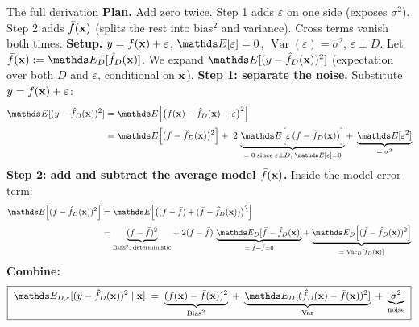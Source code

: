 \documentclass[aspectratio=169]{beamer}
\newcommand{\Var}{\operatorname{Var}}
\newcommand{\Bias}{\operatorname{Bias}}
\newcommand{\fbar}{\bar{f}}
\newcommand{\fDx}{\hat{f}_D(\xv)}
\begin{document}
\begin{frame}{The full derivation}
  \footnotesize
  \textbf{Plan.} Add zero twice. Step 1 adds $\varepsilon$ on one side (exposes $\sigma^2$). Step 2 adds $\fbar(\xv)$ (splits the rest into bias$^2$ and variance). Cross terms vanish both times.
  \vskip 4pt
  \textbf{Setup.} $y = f(\mathbf{x}) + \varepsilon$, $\E[\varepsilon] = 0$, $\Var(\varepsilon) = \sigma^2$, $\varepsilon \perp D$. Let $\fbar(\xv) := \E_D[\fDx]$. We expand $\E[(y - \fDx)^2]$ (expectation over both $D$ and $\varepsilon$, conditional on $\mathbf{x}$).
  \vfill
  \textbf{Step 1: separate the noise.} Substitute $y = f(\mathbf{x}) + \varepsilon$:
  \begin{align*}
    \E[(y - \fDx)^2]
    &= \E\!\left[\bigl(f(\xv) - \fDx + \varepsilon\bigr)^2\right] \\[2pt]
    &= \E\!\left[(f - \fDx)^2\right]
       + \;2\,\underbrace{\E\!\left[\varepsilon\,(f - \fDx)\right]}_{=\;0\;\text{since}\;\varepsilon \perp D,\;\E[\varepsilon]=0}
       + \;\underbrace{\E[\varepsilon^2]}_{=\;\sigma^2}
  \end{align*}
  \vfill
  \textbf{Step 2: add and subtract the average model $\fbar(\xv)$.} Inside the model-error term:
  \begin{align*}
    \E\!\left[(f - \fDx)^2\right]
    &= \E\!\left[\bigl((f - \fbar) + (\fbar - \fDx)\bigr)^2\right] \\[2pt]
    &= \underbrace{(f - \fbar)^2}_{\text{Bias}^2,\;\text{deterministic}}
       + \;2(f - \fbar)\,\underbrace{\E_D[\fbar - \fDx]}_{=\;\fbar - \fbar = 0}
       + \underbrace{\E_D\!\left[(\fbar - \fDx)^2\right]}_{=\;\Var_D[\fDx]}
  \end{align*}
  \vfill
  \textbf{Combine:}
  \[
    \boxed{\;\E_{D,\varepsilon}[(y - \fDx)^2 \mid \xv]
      \;=\; \underbrace{(f(\xv) - \fbar(\xv))^2}_{\Bias^2}
      \;+\; \underbrace{\E_D[(\fDx - \fbar(\xv))^2]}_{\Var}
      \;+\; \underbrace{\sigma^2}_{\text{noise}}\;}
  \]
\end{frame}
\end{document}
